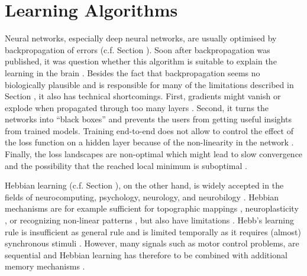 \section{Learning Algorithms}
Neural networks, especially deep neural networks, are usually optimised by backpropagation of errors (c.f. Section ).
Soon after backpropagation was published, it was question whether this algorithm is suitable to explain the learning in the brain .
Besides the fact that backpropagation seems no biologically plausible and is responsible for many of the limitations described in Section , it also has technical shortcomings.
First, gradients might vanish or explode when propagated through too many layers .
Second, it turns the networks into ``black boxes'' and prevents the users from getting useful insights from trained models.
Training end-to-end does not allow to control the effect of the loss function on a hidden layer because of the non-linearity in the network .
Finally, the loss landscapes are non-optimal which might lead to slow convergence and the possibility that the reached local minimum is suboptimal .

Hebbian learning (c.f. Section ), on the other hand, is widely accepted in the fields of neurocomputing, psychology, neurology, and neurobilogy .
Hebbian mechanisms are for example sufficient for topographic mappings , neuroplasticity , or recognizing non-linear patterns , but also have limitations .
Hebb's learning rule is insufficient as general rule and is limited temporally as it requires (almost) synchronous stimuli \cite{Anderson_1998}.
However, many signals such as motor control problems, are sequential and Hebbian learning has therefore to be combined with additional memory mechanisms .

